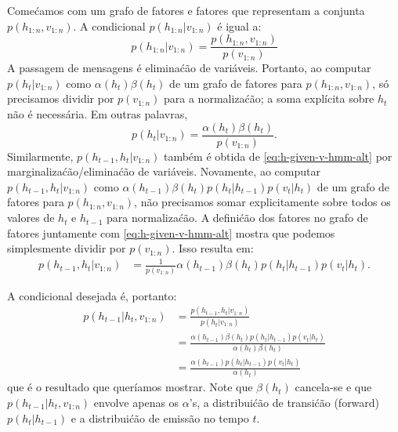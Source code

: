 \begin{exenumerate}
\begin{solution}
        Come\'camos com um grafo de fatores e fatores que representam a
        conjunta $p(h_{1:n}, v_{1:n})$. A condicional $p(h_{1:n} | v_{1:n})$ \'e igual a:
        \begin{equation}
            \label{eq:h-given-v-hmm-alt}
            p(h_{1:n} | v_{1:n}) = \frac{p(h_{1:n}, v_{1:n})}{p(v_{1:n})}
        \end{equation}
        A passagem de mensagens \'e elimina\'c\~ao de vari\'aveis. Portanto, ao computar
        $p(h_t|v_{1:n})$ como $\alpha(h_t) \beta(h_t)$ de um grafo de fatores para
        $p(h_{1:n}, v_{1:n})$, s\'o precisamos dividir por
        $p(v_{1:n})$ para a normaliza\'c\~ao; a soma expl\'icita sobre $h_t$ n\~ao \'e
        necess\'aria. Em outras palavras,
        \begin{equation}
            p(h_t|v_{1:n}) =  \frac{\alpha(h_t) \beta(h_t)}{p(v_{1:n})}.
        \end{equation}
        Similarmente, $p(h_{t-1}, h_t|v_{1:n})$ tamb\'em \'e obtida de
        \eqref{eq:h-given-v-hmm-alt} por marginaliza\'c\~ao/elimina\'c\~ao de vari\'aveis.
        Novamente, ao computar $p(h_{t-1}, h_t|v_{1:n})$ como
        $\alpha(h_{t-1}) \beta(h_t) p(h_t|h_{t-1}) p(v_t|h_t)$ de um
        grafo de fatores para $p(h_{1:n}, v_{1:n})$, n\~ao precisamos
        somar explicitamente sobre todos os valores de $h_t$ e $h_{t-1}$ para
        normaliza\'c\~ao. A defini\'c\~ao dos fatores no grafo de fatores
        juntamente com \eqref{eq:h-given-v-hmm-alt} mostra que podemos simplesmente
        dividir por $p(v_{1:n})$. Isso resulta em:
        \begin{align}
            p(h_{t-1}, h_t| v_{1:n}) & = \frac{1}{p(v_{1:n})} \alpha(h_{t-1}) \beta(h_t) p(h_t|h_{t-1}) p(v_t|h_t).
        \end{align}
        
        A condicional desejada \'e, portanto:
        \begin{align}
            p(h_{t-1} | h_t, v_{1:n}) & = \frac{p(h_{t-1}, h_t| v_{1:n})}{p(h_t|v_{1:n})} \\
            & = \frac{\alpha(h_{t-1}) \beta(h_t) p(h_t|h_{t-1}) p(v_t|h_t)}{\alpha(h_t) \beta(h_t)}\\
            & = \frac{\alpha(h_{t-1}) p(h_t|h_{t-1}) p(v_t|h_t)}{\alpha(h_t)}
        \end{align}
        que \'e o resultado que quer\'iamos mostrar. Note que
        $\beta(h_t)$ cancela-se e que $p(h_{t-1} | h_t, v_{1:n})$
        envolve apenas os $\alpha$'s, a distribui\'c\~ao de transi\'c\~ao (forward)
        $p(h_t|h_{t-1})$ e a distribui\'c\~ao de emiss\~ao no tempo $t$.
    \end{solution}
    

\end{exenumerate}
